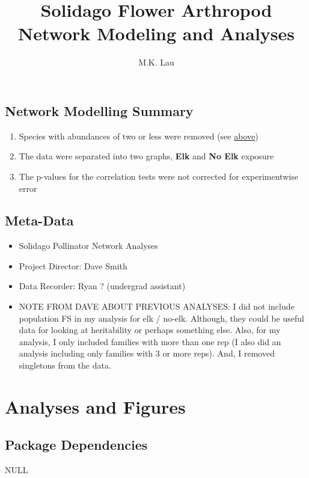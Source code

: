 \documentclass[11pt]{amsart}
\title{Solidago Flower Arthropod Network Modeling and Analyses}
\author{M.K. Lau}
\date{}                                           %
\begin{document}
\maketitle

\setcounter{tocdepth}{3}
\tableofcontents


\subsection*{Network Modelling Summary}
\begin{enumerate}
\item Species with abundances of two or less were removed (see
  \hyperlink{rm.s&d}{above})
\item The data were separated into two graphs, \textbf{Elk} and \textbf{No Elk}
  exposure
\item The p-values for the correlation tests were not corrected for
  experimentwise error
\end{enumerate}


\subsection*{Meta-Data}
\begin{itemize}
\item Solidago Pollinator Network Analyses
\item Project Director: Dave Smith
\item Data Recorder: Ryan ? (undergrad assistant)
\item NOTE FROM DAVE ABOUT PREVIOUS ANALYSES: I did not include population FS in my analysis for elk / no-elk.  Although, they could be useful data for looking at heritability or perhaps something else.  Also, for my analysis, I only included families with more than one rep (I also did an analysis including only families with 3 or more reps).  And, I removed singletons from the data.
\end{itemize}



\section{Analyses and Figures}
\subsection{Package Dependencies}


\begin{Schunk}
\begin{Soutput}
NULL
\end{Soutput}
\end{Schunk}
\end{document}
